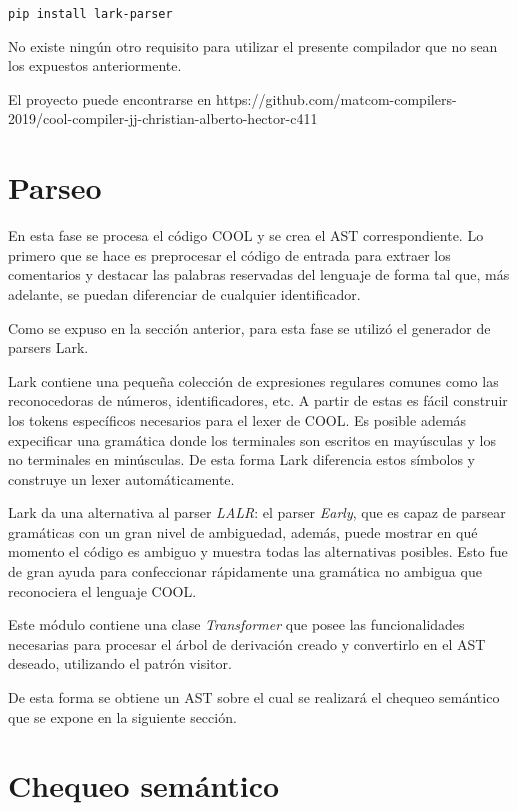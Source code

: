 \documentclass{article}
\begin{document}
	\begin{center}
		\texttt{pip install lark-parser}
	\end{center}

	No existe ning\'un otro requisito para utilizar el presente compilador que no sean los expuestos anteriormente.
	
	El proyecto puede encontrarse en https://github.com/matcom-compilers-2019/cool-compiler-jj-christian-alberto-hector-c411
	
	\section{Parseo}
	\label{sec:parsing}
	
	En esta fase se procesa el c\'odigo COOL y se crea el AST correspondiente. Lo primero que se hace es preprocesar el c\'odigo de entrada para extraer los comentarios y destacar las palabras reservadas del lenguaje de forma tal que, m\'as adelante, se puedan diferenciar de cualquier identificador. 
	
	Como se expuso en la secci\'on anterior, para esta fase se utiliz\'o el generador de parsers Lark.
	
	Lark contiene una peque\~na colecci\'on de expresiones regulares comunes como las reconocedoras de n\'umeros, identificadores, etc. A partir de estas es f\'acil construir los tokens espec\'{i}ficos necesarios para el lexer de COOL. Es posible adem\'as expecificar una gram\'atica donde los terminales son escritos en may\'usculas y los no terminales en min\'usculas. De esta forma Lark diferencia estos s\'{i}mbolos y construye un lexer autom\'aticamente.
	
	Lark da una alternativa al parser \textit{LALR}: el parser \textit{Early}, que es capaz de parsear gram\'aticas con un gran nivel de ambiguedad, adem\'as, puede mostrar en qu\'e momento el c\'odigo es ambiguo y muestra todas las alternativas posibles. Esto fue de gran ayuda para confeccionar r\'apidamente una gram\'atica no ambigua que reconociera el lenguaje COOL.
	
	Este m\'odulo contiene una clase \textit{Transformer} que posee las funcionalidades necesarias para procesar el \'arbol de derivaci\'on creado y convertirlo en el AST deseado, utilizando el patr\'on visitor.
	
	De esta forma se obtiene un AST sobre el cual se realizar\'a el chequeo sem\'antico que se expone en la siguiente secci\'on.
	
	\section{Chequeo sem\'antico}
	\label{sec:semantics}
	
\end{document}
